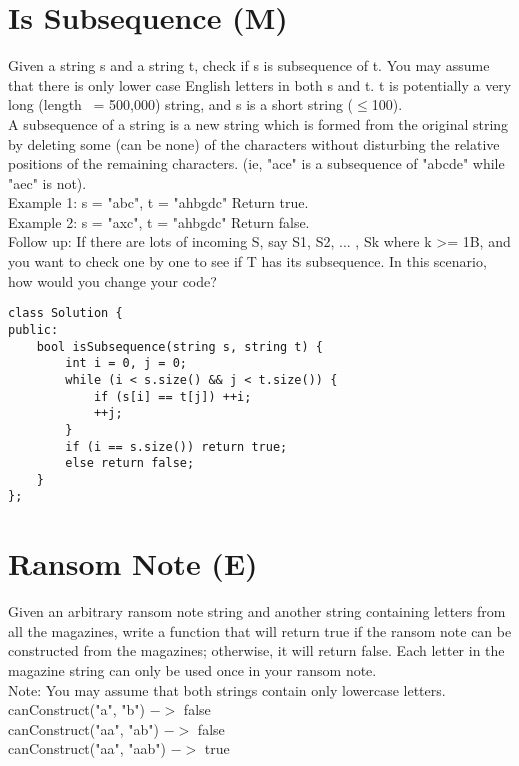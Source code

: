 \section{Is Subsequence (M)}
Given a string s and a string t, check if s is subsequence of t. You may assume that there is only lower case English letters in both s and t. t is potentially a very long (length ~= 500,000) string, and s is a short string ($\leq$100).\\

A subsequence of a string is a new string which is formed from the original string by deleting some (can be none) of the characters without disturbing the relative positions of the remaining characters. (ie, "ace" is a subsequence of "abcde" while "aec" is not).\\

Example 1:
s = "abc", t = "ahbgdc"
Return true.\\

Example 2:
s = "axc", t = "ahbgdc"
Return false.\\

Follow up:
If there are lots of incoming S, say S1, S2, ... , Sk where k >= 1B, and you want to check one by one to see if T has its subsequence. In this scenario, how would you change your code?\\

\begin{lstlisting}
class Solution {
public:
    bool isSubsequence(string s, string t) {
        int i = 0, j = 0;
        while (i < s.size() && j < t.size()) {
            if (s[i] == t[j]) ++i;
            ++j;
        }
        if (i == s.size()) return true;
        else return false;
    }
};
\end{lstlisting}


\section{Ransom Note (E)}
Given an arbitrary ransom note string and another string containing letters from all the magazines, write a function that will return true if the ransom note can be constructed from the magazines; otherwise, it will return false. Each letter in the magazine string can only be used once in your ransom note. \\

Note:
You may assume that both strings contain only lowercase letters.\\

canConstruct("a", "b") $->$ false\\
canConstruct("aa", "ab") $->$ false\\
canConstruct("aa", "aab") $->$ true\\

